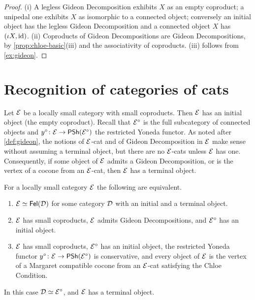 \begin{proof}
(i) A legless Gideon Decomposition exhibits $X$ as an empty coproduct; a unipedal
one exhibits $X$ as isomorphic to a connected object; conversely an initial
object has the legless Gideon Decomposition and a connected object $X$ has
$(\iota X,\mathrm{id})$. (ii) Coproducts of Gideon Decompositions are Gideon
Decompositions, by \cref{prop:chloe-basic}(iii) and the associativity of
coproducts. (iii) follows from \cref{ex:gideon}.
\end{proof}

\section{Recognition of categories of cats}\label{sec:recognition}

Let $\mathcal{E}$ be a locally small category with small coproducts. Then $\mathcal{E}$ has an
initial object (the empty coproduct). Recall that $\mathcal{E}^\circ$ is the full
subcategory of connected objects and $y^\circ\colon\mathcal{E}\to\mathsf{PSh}(\mathcal{E}^\circ)$ the
restricted Yoneda functor. As noted after \cref{def:gideon}, the notions of
$\mathcal{E}$-cat and of Gideon Decomposition in $\mathcal{E}$ make sense without assuming a
terminal object, but there are no $\mathcal{E}$-cats unless $\mathcal{E}$ has one. Consequently,
if some object of $\mathcal{E}$ admits a Gideon Decomposition, or is the vertex of a
cocone from an $\mathcal{E}$-cat, then $\mathcal{E}$ has a terminal object.

\begin{theorem}[Recognition]\label{thm:recognition}
For a locally small category $\mathcal{E}$ the following are equivalent.
\begin{enumerate}
\item\label{it:rec-fel} $\mathcal{E}\simeq\mathsf{Fel}(\mathcal{D})$ for some category $\mathcal{D}$ with an
  initial and a terminal object.
\item\label{it:rec-gideon} $\mathcal{E}$ has small coproducts, $\mathcal{E}$ admits Gideon
  Decompositions, and $\mathcal{E}^\circ$ has an initial object.
\item\label{it:rec-margaret} $\mathcal{E}$ has small coproducts, $\mathcal{E}^\circ$ has an
  initial object, the restricted Yoneda functor
  $y^\circ\colon\mathcal{E}\to\mathsf{PSh}(\mathcal{E}^\circ)$ is conservative, and every object of $\mathcal{E}$
  is the vertex of a Margaret compatible cocone from an $\mathcal{E}$-cat satisfying the
  Chloe Condition.
\end{enumerate}
In this case $\mathcal{D}\simeq\mathcal{E}^\circ$, and $\mathcal{E}$ has a terminal object.
\end{theorem}

